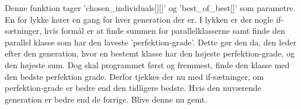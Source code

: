 Denne funktion tager ’chosen\_individuals[][]’ og ’best\_of\_best[]’ som parametre. En for lykke kører en gang for hver generation der er. I lykken er der nogle if-sætninger, hvis formål er at finde summen for parallelklasserne samt finde den parallel klasse som har den laveste ’perfektion-grade’. Dette gør den da, den leder efter den generation, hvor en bestemt klasse har den højeste perfektion-grade, og den højeste sum. Dog skal programmet først og fremmest, finde den klasse med den bedste perfektion grade. 
Derfor tjekkes der nu med if-sætninger, om perfektion-grade er bedre end den tidligere bedste. Hvis den nuværende generation er bedre end de forrige. Blive denne nu gemt.